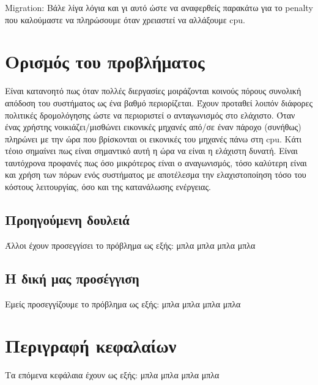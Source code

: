 Migration: Βάλε λίγα λόγια και γι αυτό ώστε να αναφερθείς παρακάτω για το
penalty που καλούμαστε να πληρώσουμε όταν χρειαστεί να αλλάξουμε cpu.
\section{Ορισμός του προβλήματος}
Είναι κατανοητό πως όταν πολλές διεργασίες μοιράζονται κοινούς πόρους συνολική
απόδοση του συστήματος ως ένα βαθμό περιορίζεται. Έχουν προταθεί λοιπόν διάφορες
πολιτικές δρομολόγησης ώστε να περιοριστεί ο ανταγωνισμός στο ελάχιστο. Όταν
ένας χρήστης νοικιάζει/μισθώνει εικονικές μηχανές από/σε έναν πάροχο (συνήθως)
πληρώνει με την ώρα που βρίσκονται οι εικονικές του μηχανές πάνω στη cpu. Κάτι
τέοιο σημαίνει πως είναι σημαντικό αυτή η ώρα να είναι η ελάχιστη δυνατή. Είναι
ταυτόχρονα προφανές πως όσο μικρότερος είναι ο αναγωνισμός, τόσο καλύτερη είναι
και χρήση των πόρων ενός συστήματος με αποτέλεσμα την ελαχιστοποίηση τόσο του
κόστους λειτουργίας, όσο και της κατανάλωσης ενέργειας.
\subsection{Προηγούμενη δουλειά}
Άλλοι έχουν προσεγγίσει το πρόβλημα ως εξής: μπλα μπλα μπλα μπλα
\subsection{Η δική μας προσέγγιση}
Εμείς προσεγγίζουμε το πρόβλημα ως εξής: μπλα μπλα μπλα μπλα
\section{Περιγραφή κεφαλαίων}
Τα επόμενα κεφάλαια έχουν ως εξής: μπλα μπλα μπλα μπλα
